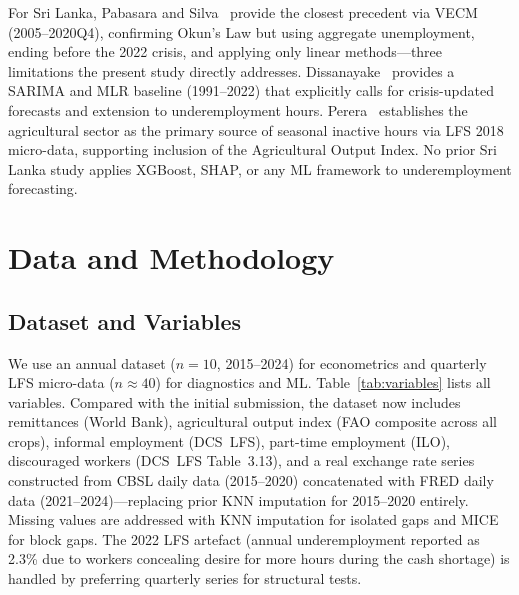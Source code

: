 \documentclass[sigconf]{acmart}
\begin{document}
For Sri Lanka, Pabasara and Silva~\cite{pabasara2025impact} provide the
closest precedent via VECM (2005--2020Q4), confirming Okun's Law but using
aggregate unemployment, ending before the 2022 crisis, and applying only
linear methods---three limitations the present study directly addresses.
Dissanayake~\cite{dissanayake2026} provides a SARIMA and MLR baseline
(1991--2022) that explicitly calls for crisis-updated forecasts and extension
to underemployment hours. Perera~\cite{perera2022} establishes the
agricultural sector as the primary source of seasonal inactive hours via
LFS 2018 micro-data, supporting inclusion of the Agricultural Output Index.
No prior Sri Lanka study applies XGBoost, SHAP, or any ML framework to
underemployment forecasting.

\section{Data and Methodology}

\subsection{Dataset and Variables}

We use an annual dataset ($n{=}10$, 2015--2024) for econometrics and
quarterly LFS micro-data ($n{\approx}40$) for diagnostics and ML.
Table~\ref{tab:variables} lists all variables. Compared with the initial
submission, the dataset now includes remittances (World Bank), agricultural
output index (FAO composite across all crops), informal employment
(DCS~LFS), part-time employment (ILO), discouraged workers (DCS~LFS
Table~3.13), and a real exchange rate series constructed from CBSL daily
data (2015--2020) concatenated with FRED daily data (2021--2024)---replacing
prior KNN imputation for 2015--2020 entirely. Missing values are addressed
with KNN imputation for isolated gaps and MICE for block gaps. The 2022
LFS artefact (annual underemployment reported as 2.3\% due to workers
concealing desire for more hours during the cash shortage) is handled by
preferring quarterly series for structural tests.
\end{document}
